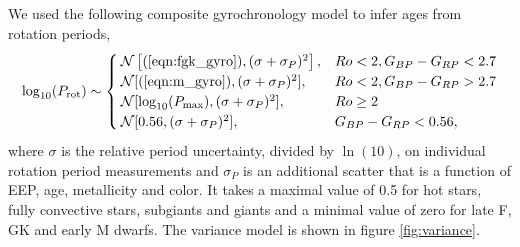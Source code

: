 We used the following composite gyrochronology model to infer ages from
rotation periods,
\begin{equation}
    \log_{10}(P_\mathrm{rot}) \sim \begin{cases}
        \mathcal{N}\left[(\ref{eqn:fgk_gyro}), (\sigma+\sigma_P)^2\right], & Ro < 2,
        G_{BP} - G_{RP} < 2.7 \\
        \mathcal{N}[(\ref{eqn:m_gyro}), (\sigma+\sigma_P)^2], & Ro < 2,
        G_{BP} - G_{RP} > 2.7 \\
        \mathcal{N}[\log_{10}(P_\mathrm{max}), (\sigma+\sigma_P)^2],& Ro \geq 2 \\
        \mathcal{N}[0.56, (\sigma+\sigma_P)^2],& G_{BP} - G_{RP} < 0.56,
    \end{cases}
\label{eqn:gyro}
\end{equation}
where $\sigma$ is the relative period uncertainty, divided by $\ln(10)$, on
individual rotation period measurements and $\sigma_P$ is an additional
scatter that is a function of EEP, age, metallicity and color.
It takes a maximal value of 0.5 for hot stars, fully convective stars,
subgiants and giants and a minimal value of zero for late F, GK and early M
dwarfs.
The variance model is shown in figure \ref{fig:variance}.

